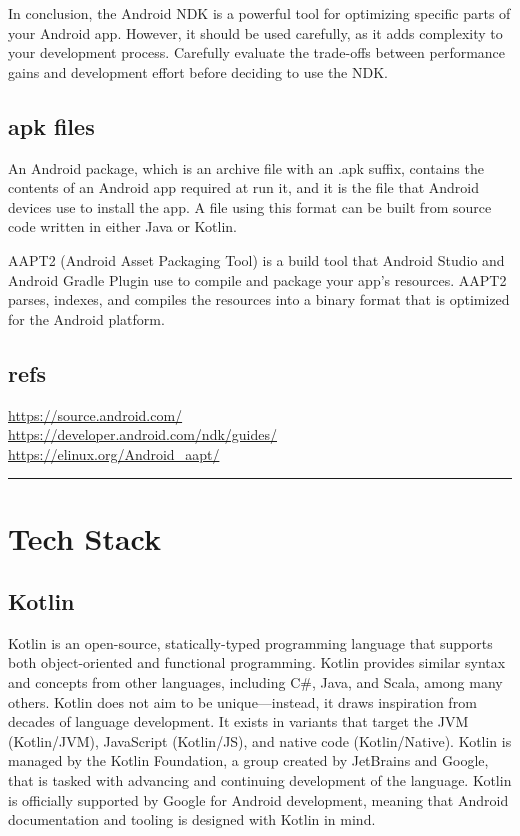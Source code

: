 \documentclass[12pt,oneside]{book}
\begin{document}
In conclusion, the Android NDK is a powerful tool for optimizing specific parts of your Android app. However, it should be used carefully, as it adds complexity to your development process. Carefully evaluate the trade-offs between performance gains and development effort before deciding to use the NDK.

\section{apk files}
An Android package, which is an archive file with an .apk suffix, contains the contents of an Android app required at run it, and it is the file that Android devices use to install the app. A file using this format can be built from source code written in either Java or Kotlin.

AAPT2 (Android Asset Packaging Tool) is a build tool that Android Studio and Android Gradle Plugin use to compile and package your app's resources. AAPT2 parses, indexes, and compiles the resources into a binary format that is optimized for the Android platform.
\vfill

\section*{refs} 
\url{https://source.android.com/} \\
\url{https://developer.android.com/ndk/guides/} \\
\url{https://elinux.org/Android_aapt/}
\rule{\textwidth}{0.4pt}

\chapter{Tech Stack}
\section{Kotlin}
Kotlin is an open-source, statically-typed programming language that supports both object-oriented and functional programming. Kotlin provides similar syntax and concepts from other languages, including C\#, Java, and Scala, among many others. Kotlin does not aim to be unique—instead, it draws inspiration from decades of language development. It exists in variants that target the JVM (Kotlin/JVM), JavaScript (Kotlin/JS), and native code (Kotlin/Native).
Kotlin is managed by the Kotlin Foundation, a group created by JetBrains and Google, that is tasked with advancing and continuing development of the language. Kotlin is officially supported by Google for Android development, meaning that Android documentation and tooling is designed with Kotlin in mind.
\end{document}
